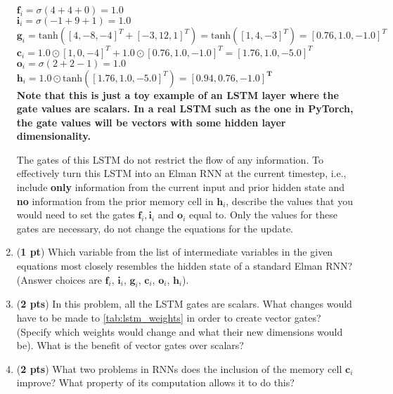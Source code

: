 \documentclass[11pt, letterpaper]{article}
\begin{document}
\begin{enumerate}[label=(\alph*)]
$\boldsymbol{f}_{i} = \sigma(4 + 4 + 0) = 1.0$ \\
\indent $\boldsymbol{i}_{i} = \sigma(-1 + 9 + 1) = 1.0$ \\
\indent $\boldsymbol{g}_{i} = \text{tanh}([4, -8, -4]^T + [-3, 12, 1]^T) = \text{tanh}([1,4,-3]^T) = [0.76, 1.0, -1.0]^T$\\
\indent $\boldsymbol{c}_{i} = 1.0 \odot [1,0,-4]^T + 1.0 \odot [0.76, 1.0, -1.0]^T = [1.76, 1.0, -5.0]^T $ \\
\indent $\boldsymbol{o}_{i} = \sigma(2 + 2 - 1) = 1.0$\\
\indent $\boldsymbol{h}_{i} = 1.0 \odot \text{tanh}([1.76, 1.0, -5.0]^T) = \mathbf{[0.94, 0.76, -1.0]^T}$\\

\textbf{Note that this is just a toy example of an LSTM layer where the gate values are scalars. In a real LSTM such as the one in PyTorch, the gate values will be vectors with some hidden layer dimensionality.}


The gates of this LSTM do not restrict the flow of any information. To effectively turn this LSTM into an Elman RNN at the current timestep, i.e., include \textbf{only} information from the current input and prior hidden state and \textbf{no} information from the prior memory cell in $\boldsymbol{h}_{i}$, describe the values that you would need to set the gates $\boldsymbol{f}_{i}, \boldsymbol{i}_{i}$ and $\boldsymbol{o}_{i}$ equal to. Only the values for these gates are necessary, do not change the equations for the update.


\item (\textbf{1 pt})  Which variable from the list of intermediate variables in the given equations most closely resembles the hidden state of a standard Elman RNN? (Answer choices are $\boldsymbol{f}_{i}$, $\boldsymbol{i}_{i}$, $\boldsymbol{g}_{i}$, $\boldsymbol{c}_{i}$, $\boldsymbol{o}_{i}$, $\boldsymbol{h}_{i}$).


\item (\textbf{2 pts})  In this problem, all the LSTM gates are scalars. What changes would have to be made to \autoref{tab:lstm_weights} in order to create vector gates? (Specify which weights would change and what their new dimensions would be). What is the benefit of vector gates over scalars?


\item (\textbf{2 pts})   What two problems in RNNs does the inclusion of the memory cell $\boldsymbol{c}_{i}$ improve? What property of its computation allows it to do this?


\end{enumerate}
\end{document}
